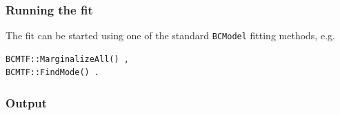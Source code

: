\documentclass[11pt, a4paper]{article}
\begin{document}
\subsubsection{Running the fit}

The fit can be started using one of the standard \verb|BCModel| fitting methods,
e.g.
%
\begin{verbatim}
BCMTF::MarginalizeAll() ,
BCMTF::FindMode() .
\end{verbatim}

\subsubsection{Output}
\label{section:mtfoutput}
\end{document}
